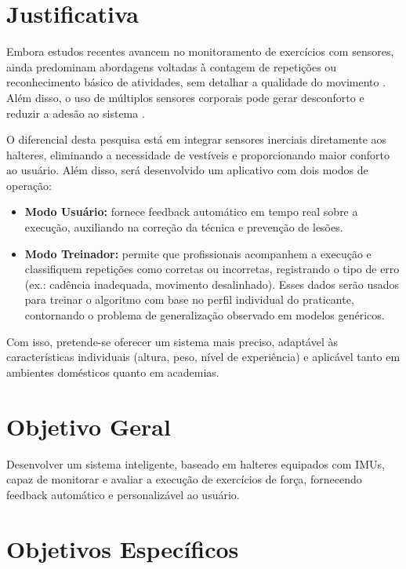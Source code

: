 \section{Justificativa}

Embora estudos recentes avancem no monitoramento de exercícios com sensores, ainda predominam abordagens voltadas à contagem de repetições ou reconhecimento básico de atividades, sem detalhar a qualidade do movimento \cite{dzaja-quantitative-nodate}. Além disso, o uso de múltiplos sensores corporais pode gerar desconforto e reduzir a adesão ao sistema \cite{balkhi-multipurpose-nodate}.  

O diferencial desta pesquisa está em integrar sensores inerciais diretamente aos halteres, eliminando a necessidade de vestíveis e proporcionando maior conforto ao usuário. Além disso, será desenvolvido um aplicativo com dois modos de operação:  
\begin{itemize}
    \item \textbf{Modo Usuário:} fornece feedback automático em tempo real sobre a execução, auxiliando na correção da técnica e prevenção de lesões.  
    \item \textbf{Modo Treinador:} permite que profissionais acompanhem a execução e classifiquem repetições como corretas ou incorretas, registrando o tipo de erro (ex.: cadência inadequada, movimento desalinhado). Esses dados serão usados para treinar o algoritmo com base no perfil individual do praticante, contornando o problema de generalização observado em modelos genéricos.  
\end{itemize}

Com isso, pretende-se oferecer um sistema mais preciso, adaptável às características individuais (altura, peso, nível de experiência) e aplicável tanto em ambientes domésticos quanto em academias.

\section{Objetivo Geral}

Desenvolver um sistema inteligente, baseado em halteres equipados com IMUs, capaz de monitorar e avaliar a execução de exercícios de força, fornecendo feedback automático e personalizável ao usuário.

\section{Objetivos Específicos}

